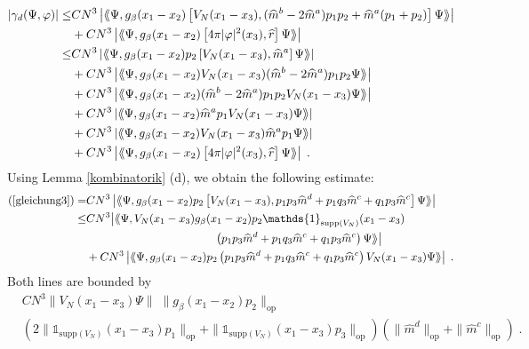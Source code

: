 \documentclass[11pt, english, american]{article}
\newcommand{\laa}{\langle\hspace{-0.08cm}\langle}
\newcommand{\raa}{\rangle\hspace{-0.08cm}\rangle}
\renewcommand{\phi}{\varphi}
\newcommand{\cs}{\gamma_d}
\begin{document}
\begin{align}\nonumber|\cs (\Psi,\phi)|\leq &C N^3\left|\laa\Psi ,g_{\beta}(x_{1}-x_{2})
\left[V_N(x_1-x_3),
(\widehat{m}^b-2\widehat{m}^a)p_{1}p_{2}+\widehat{m}^a(p_{1}+p_2)\right] \Psi\raa\right|
%
\\&\nonumber+C N^3\left|\laa\Psi ,g_{\beta}(x_{1}-x_{2})
\left[4\pi|\phi|^2(x_3),
\widehat{r}\right] \Psi\raa\right|
%
%
\\\label{gleichung3}\leq&C N^3\left|\laa\Psi ,g_{\beta}(x_{1}-x_{2})p_2
\left[V_N(x_1-x_3),
\widehat{m}^a\right] \Psi\raa\right|
%
\\\label{gleichung1}&+C N^3\left|\laa\Psi ,g_{\beta}(x_{1}-x_{2})
V_N(x_1-x_3)
(\widehat{m}^b-2\widehat{m}^a)p_{1}p_{2}\Psi\raa\right|
%
\\\label{gleichung2}&+C N^3\left|\laa\Psi ,g_{\beta}(x_{1}-x_{2})
(\widehat{m}^b-2\widehat{m}^a)p_{1}p_{2}V_N(x_1-x_3) \Psi\raa\right|
%
\\\label{gleichung4}&+C N^3\left|\laa\Psi ,g_{\beta}(x_{1}-x_{2})
\widehat{m}^ap_{1} V_N(x_1-x_3)\Psi\raa\right|
%
\\\label{gleichung5}&+C N^3\left|\laa\Psi ,g_{\beta}(x_{1}-x_{2})V_N(x_1-x_3)
\widehat{m}^ap_{1} \Psi\raa\right|
%
\\\label{gleichung6}&+C N^3\left|\laa\Psi ,g_{\beta}(x_{1}-x_{2})
\left[4 \pi |\phi|^2(x_3),
\widehat{r}\right] \Psi\raa\right|
%
%
\;.
\end{align}
Using Lemma \ref{kombinatorik} (d),
we obtain the following estimate:
\begin{align*}
(\ref{gleichung3})=&
C N^3\left|\laa\Psi ,g_{\beta}(x_{1}-x_{2})p_2
\left[V_N(x_1-x_3),
p_1p_3\widehat{m}^d+p_1q_3\widehat{m}^c+q_1p_3\widehat{m}^c\right] \Psi\raa\right|
%
\\\leq&
C N^3\big|\laa\Psi ,V_N(x_1-x_3)g_{\beta}(x_{1}-x_{2})p_2\mathds{1}_{\text{supp}(V_N)}(x_1-x_3)
\\&\hspace{4cm}\left(p_1p_3\widehat{m}^d+p_1q_3\widehat{m}^c+q_1p_3\widehat{m}^c\right) \Psi\raa\big|
%
\\&+
C N^3\left|\laa\Psi ,g_{\beta}(x_{1}-x_{2})p_2\left(
p_1p_3\widehat{m}^d+p_1q_3\widehat{m}^c+q_1p_3\widehat{m}^c\right)V_N(x_1-x_3)\Psi\raa\right|
\;.
\end{align*}
Both lines are bounded by
\begin{align*}
&C N^3\|V_N(x_1-x_3)\Psi\|\;\|g_{\beta}(x_{1}-x_{2})p_2\|_{\text{op}}
\\&\left(2\|\mathds{1}_{\text{supp}(V_N)}(x_1-x_3)p_1\|_{\text{op}}+\|\mathds{1}_{\text{supp}(V_N)}(x_1-x_3)p_3\|_{\text{op}}\right)
\left(\|\widehat{m}^d\|_{\text{op}}+\|\widehat{m}^c\|_{\text{op}}\right)
\;.
\end{align*}
\end{document}
